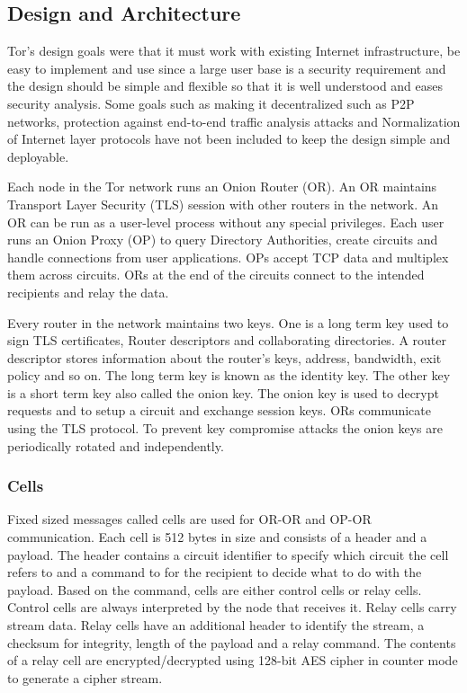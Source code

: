\documentclass{llncs}
\begin{document}
\subsection{Design and Architecture}
Tor's design goals were that it must work with existing Internet infrastructure, be easy to implement and use since a large user base is a security requirement and the design should be simple and flexible so that it is well understood and eases security analysis. Some goals such as making it decentralized such as P2P networks, protection against end-to-end traffic analysis attacks and Normalization of Internet layer protocols have not been included to keep the design simple and deployable.

Each node in the Tor network runs an Onion Router (OR). An OR maintains Transport Layer Security (TLS) session with other routers in the network. An OR can be run as a user-level process without any special privileges. Each user runs an Onion Proxy (OP) to query Directory Authorities, create circuits and handle connections from user applications. OPs accept TCP data and multiplex them across circuits. ORs at the end of the circuits connect to the intended recipients and relay the data.

Every router in the network maintains two keys. One is a long term key used to sign TLS certificates, Router descriptors and collaborating directories. A router descriptor stores information about the router's keys, address, bandwidth, exit policy and so on. The long term key is known as the identity key. The other key is a short term key also called the onion key. The onion key is used to decrypt requests and to setup a circuit and exchange session keys. ORs communicate using the TLS protocol. To prevent key compromise attacks the onion keys are periodically rotated and independently.

\subsubsection{Cells}
Fixed sized messages called cells are used for OR-OR and OP-OR communication. Each cell is 512 bytes in size and consists of a header and a payload. The header contains a circuit identifier to specify which circuit the cell refers to and a command to for the recipient to decide what to do with the payload.
Based on the command, cells are either control cells or relay cells. Control cells are always interpreted by the node that receives it. Relay cells carry stream data. Relay cells have an additional header to identify the stream, a checksum for integrity, length of the payload and a relay command. The contents of a relay cell are encrypted/decrypted using 128-bit AES cipher in counter mode to generate a cipher stream.
\end{document}
